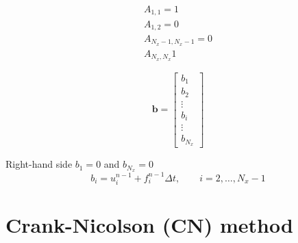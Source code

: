 \documentclass[a4paper,12pt]{article}
\begin{document}
\begin{align*}
A_{1,1} = 1 \\
A_{1,2} = 0 \\
A_{N_x-1,N_x-1} = 0 \\
A_{N_x,N_x} 1
\end{align*}

\begin{equation}
\mathbf{b} = \begin{bmatrix}
b_{1} \\
b_{2} \\
\vdots \\
b_{i} \\
\vdots \\
b_{N_x}
\end{bmatrix}
\end{equation}

Right-hand side $b_{1} = 0$ and $b_{N_x} = 0$
\begin{equation}
b_{i} = u^{n-1}_{i} + f_{i}^{n-1} \Delta t, \qquad i = 2, \ldots, N_{x}-1
\end{equation}



\section{Crank-Nicolson (CN) method}
\end{document}

